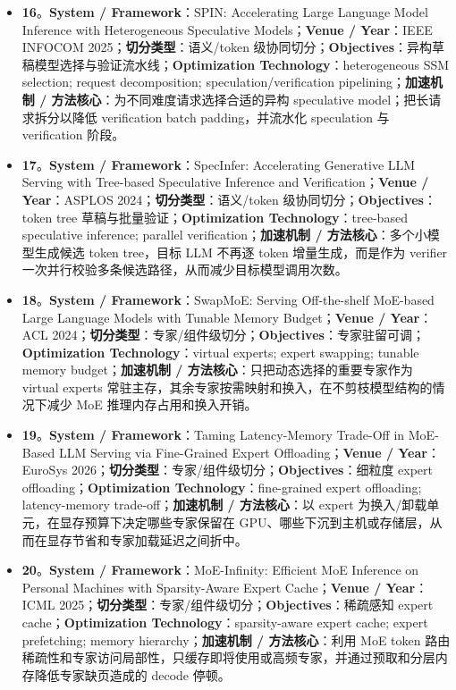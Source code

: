 \documentclass[a4paper,twocolumn,10pt]{ctexart}
\begin{document}
\begin{itemize}
\item \textbf{16}。\textbf{System / Framework}：SPIN: Accelerating Large Language Model Inference with Heterogeneous Speculative Models；\textbf{Venue / Year}：IEEE INFOCOM 2025；\textbf{切分类型}：语义/token 级协同切分；\textbf{Objectives}：异构草稿模型选择与验证流水线；\textbf{Optimization Technology}：heterogeneous SSM selection; request decomposition; speculation/verification pipelining；\textbf{加速机制 / 方法核心}：为不同难度请求选择合适的异构 speculative model；把长请求拆分以降低 verification batch padding，并流水化 speculation 与 verification 阶段。
\item \textbf{17}。\textbf{System / Framework}：SpecInfer: Accelerating Generative LLM Serving with Tree-based Speculative Inference and Verification；\textbf{Venue / Year}：ASPLOS 2024；\textbf{切分类型}：语义/token 级协同切分；\textbf{Objectives}：token tree 草稿与批量验证；\textbf{Optimization Technology}：tree-based speculative inference; parallel verification；\textbf{加速机制 / 方法核心}：多个小模型生成候选 token tree，目标 LLM 不再逐 token 增量生成，而是作为 verifier 一次并行校验多条候选路径，从而减少目标模型调用次数。
\item \textbf{18}。\textbf{System / Framework}：SwapMoE: Serving Off-the-shelf MoE-based Large Language Models with Tunable Memory Budget；\textbf{Venue / Year}：ACL 2024；\textbf{切分类型}：专家/组件级切分；\textbf{Objectives}：专家驻留可调；\textbf{Optimization Technology}：virtual experts; expert swapping; tunable memory budget；\textbf{加速机制 / 方法核心}：只把动态选择的重要专家作为 virtual experts 常驻主存，其余专家按需映射和换入，在不剪枝模型结构的情况下减少 MoE 推理内存占用和换入开销。
\item \textbf{19}。\textbf{System / Framework}：Taming Latency-Memory Trade-Off in MoE-Based LLM Serving via Fine-Grained Expert Offloading；\textbf{Venue / Year}：EuroSys 2026；\textbf{切分类型}：专家/组件级切分；\textbf{Objectives}：细粒度 expert offloading；\textbf{Optimization Technology}：fine-grained expert offloading; latency-memory trade-off；\textbf{加速机制 / 方法核心}：以 expert 为换入/卸载单元，在显存预算下决定哪些专家保留在 GPU、哪些下沉到主机或存储层，从而在显存节省和专家加载延迟之间折中。
\item \textbf{20}。\textbf{System / Framework}：MoE-Infinity: Efficient MoE Inference on Personal Machines with Sparsity-Aware Expert Cache；\textbf{Venue / Year}：ICML 2025；\textbf{切分类型}：专家/组件级切分；\textbf{Objectives}：稀疏感知 expert cache；\textbf{Optimization Technology}：sparsity-aware expert cache; expert prefetching; memory hierarchy；\textbf{加速机制 / 方法核心}：利用 MoE token 路由稀疏性和专家访问局部性，只缓存即将使用或高频专家，并通过预取和分层内存降低专家缺页造成的 decode 停顿。

\end{itemize}
\end{document}
